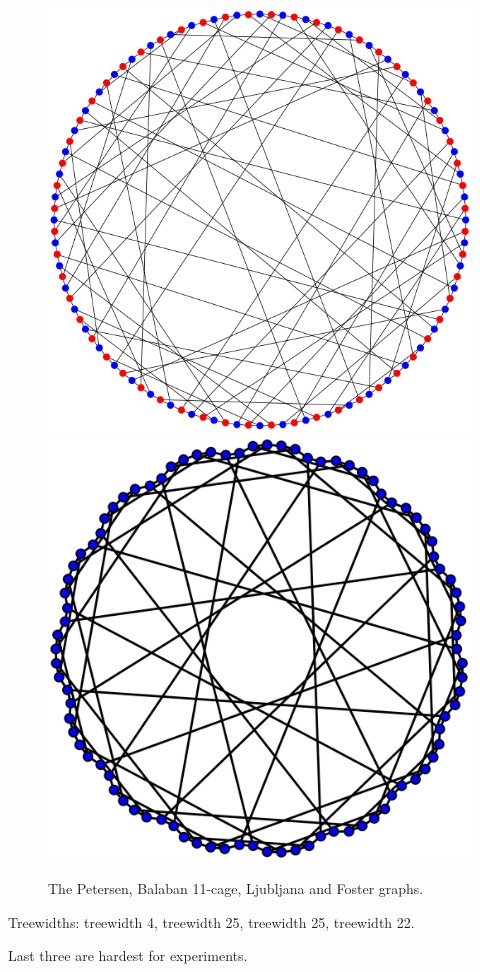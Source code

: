 \documentclass[11pt]{beamer}
\begin{document}
\begin{frame}
\begin{center}
\begin{figure}[h!]
\hspace*{3mm}
\includegraphics[scale=0.12]{Ljubljana}
\hspace*{3mm}
\includegraphics[scale=0.06]{Foster}
\caption{The Petersen, Balaban 11-cage, Ljubljana and Foster graphs.}
\end{figure}
\end{center}

Treewidths: treewidth 4, treewidth 25, treewidth 25, treewidth 22.

Last three are hardest for experiments.

\end{frame}
\end{document}
